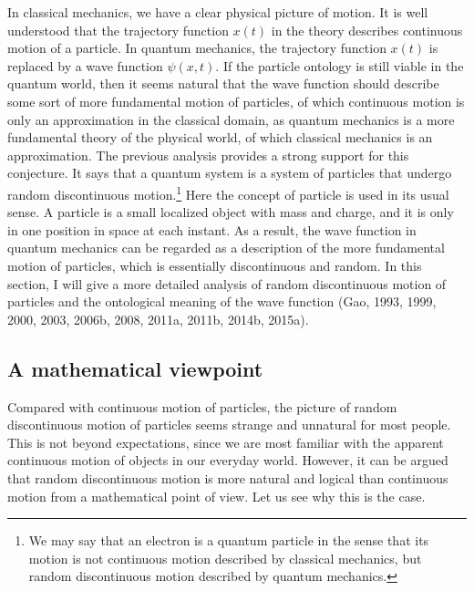 In classical mechanics, we have a clear physical picture of motion. It is well understood that the trajectory function $x(t)$ in the theory describes continuous motion of a particle. In quantum mechanics, the trajectory function $x(t)$ is replaced by a wave function $\psi(x,t)$. If the particle ontology is still viable in the quantum world, then it seems natural that the wave function should describe some sort of more fundamental motion of particles, of which continuous motion is only an approximation in the classical domain, as quantum mechanics is a more fundamental theory of the physical world, of which classical mechanics is an approximation. The previous analysis provides a strong support for this conjecture. It says that a quantum system is a system of particles that undergo random discontinuous motion.\footnote{We may say that an electron is a quantum particle in the sense that its motion is not continuous motion described by classical mechanics, but random discontinuous motion described by quantum mechanics.} 
Here the concept of particle is used in its usual sense. A particle is a small localized object with mass and charge, and it is only in one position in space at each instant. 
As a result, the wave function in quantum mechanics can be regarded as a description of the more fundamental motion of particles, which is essentially discontinuous and random. In this section, I will give a more detailed analysis of random discontinuous motion of particles and the ontological meaning of the wave function (Gao, 1993, 1999, 2000, 2003, 2006b, 2008, 2011a, 2011b, 2014b, 2015a).


\subsection{A mathematical viewpoint}

Compared with continuous motion of particles, the picture of random discontinuous motion of particles seems strange and unnatural for most people. 
This is not beyond expectations, since we are most familiar with the apparent continuous motion of objects in our everyday world.
However, it can be argued that random discontinuous motion is more natural and logical than continuous motion from a mathematical point of view. 
Let us see why this is the case.

